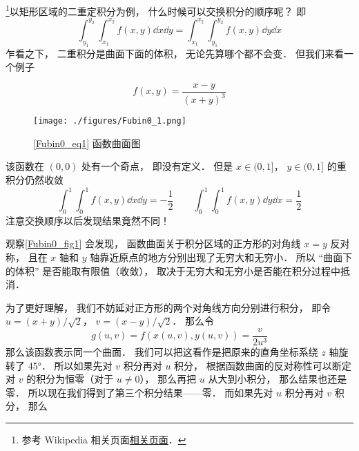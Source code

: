 

\footnote{参考 Wikipedia 相关页面\href{https://en.wikipedia.org/wiki/Fubini's_theorem}{相关页面}．}以矩形区域的二重定积分为例， 什么时候可以交换积分的顺序呢？ 即
\begin{equation}
\int_{y_1}^{y_2}\int_{x_1}^{x_2} f(x, y) \dd{x} \dd{y} = \int_{x_1}^{x_2}\int_{y_1}^{y_2} f(x, y) \dd{y}\dd{x}
\end{equation}
乍看之下， 二重积分是曲面下面的体积， 无论先算哪个都不会变． 但我们来看一个例子

\begin{example}{}
\begin{equation}\label{Fubin0_eq1}
f(x, y) = \frac{x - y}{(x+y)^3}
\end{equation}
\begin{figure}[ht]
\centering
\texttt{[image: ./figures/Fubin0\_1.png]}
\caption{\autoref{Fubin0_eq1} 函数曲面图} \label{Fubin0_fig1}
\end{figure}
该函数在 $(0,0)$ 处有一个奇点， 即没有定义． 但是 $x \in (0, 1]$， $y \in (0, 1]$ 的重积分仍然收敛
\begin{equation}
\int_0^1 \int_0^1 f(x,y) \dd{x} \dd{y} = -\frac{1}{2}
\qquad
\int_0^1 \int_0^1 f(x,y) \dd{y} \dd{x} = \frac{1}{2}
\end{equation}
注意交换顺序以后发现结果竟然不同！

观察\autoref{Fubin0_fig1} 会发现， 函数曲面关于积分区域的正方形的对角线 $x=y$ 反对称， 且在 $x$ 轴和 $y$ 轴靠近原点的地方分别出现了无穷大和无穷小． 所以 “曲面下的体积” 是否能取有限值（收敛）， 取决于无穷大和无穷小是否能在积分过程中抵消．

为了更好理解， 我们不妨延对正方形的两个对角线方向分别进行积分， 即令 $u = (x+y)/\sqrt{2}$， $v=(x-y)/\sqrt{2}$． 那么令
\begin{equation}
g(u,v) = f(x(u,v), y(u,v)) = \frac{v}{2u^3}
\end{equation}
那么该函数表示同一个曲面． 我们可以把这看作是把原来的直角坐标系绕 $z$ 轴旋转了 45°． 所以如果先对 $v$ 积分再对 $u$ 积分， 根据函数曲面的反对称性可以断定对 $v$ 的积分为恒零（对于 $u\ne 0$）， 那么再把 $u$ 从大到小积分， 那么结果也还是零． 所以现在我们得到了第三个积分结果——零． 而如果先对 $u$ 积分再对 $v$ 积分， 那么

\end{example}
